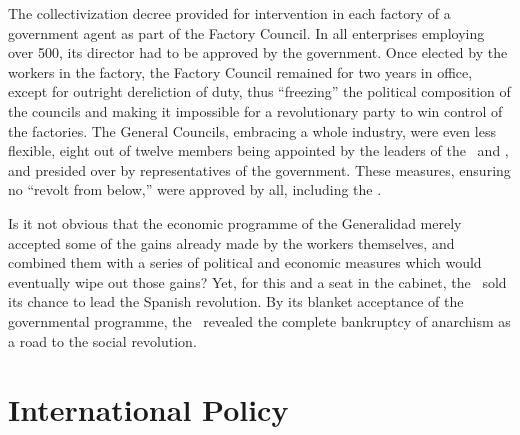 The collectivization decree provided for intervention in each factory of a government agent as part of the Factory Council. In all enterprises employing over 500, its director had to be approved by the government. Once elected by the workers in the factory, the Factory Council remained for two years in office, except for outright dereliction of duty, thus ``freezing'' the political composition of the councils and making it impossible for a revolutionary party to win control of the factories. The General Councils, embracing a whole industry, were even less flexible, eight out of twelve members being appointed by the leaders of the \UGT\ and \CNT, and presided over by representatives of the government. These measures, ensuring no ``revolt from below,'' were approved by all, including the \POUM.

Is it not obvious that the economic programme of the Generalidad merely accepted some of the gains already made by the workers themselves, and combined them with a series of political and economic measures which would eventually wipe out those gains? Yet, for this and a seat in the cabinet, the \POUM\ sold its chance to lead the Spanish revolution. By its blanket acceptance of the governmental programme, the \CNT\ revealed the complete bankruptcy of anarchism as a road to the social revolution.

\section{International Policy}

